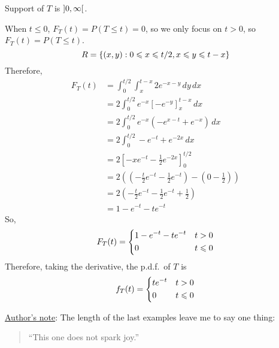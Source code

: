 \begin{Example}{}{}
\begin{enumerate}[label=(\roman*)]
              Support of $ T $ is $ \interval[open]{0}{\infty} $.

              When $ t\leqslant 0 $, $ F_T(t)=P(T\leqslant t)=0 $,
              so we only focus on $ t>0 $, so $ F_T(t)=P(T\leqslant t) $.
              \[ R=\{(x,y):0\leqslant x\leqslant t/2, x\leqslant y\leqslant t-x\} \]
              Therefore,
              \begin{align*}
                  F_T(t)
                   & = \int_{0}^{t/2} \int_{x}^{t-x} 2e^{-x-y}\, d{y} \, d{x}             \\
                   & =2 \int_{0}^{t/2} e^{-x}\left[ -e^{-y} \right]_x^{t-x}\, d{x}        \\
                   & =2 \int_{0}^{t/2} e^{-x}\left( -e^{x-t}+e^{-x} \right)\, d{x}        \\
                   & =2 \int_{0}^{t/2} -e^{-t}+e^{-2x}\, d{x}                             \\
                   & =2\left[ -xe^{-t}-\frac{1}{2}e^{-2x} \right]_0^{t/2}                 \\
                   & =2\left( \left( -\frac{t}{2} e^{-t} -\frac{1}{2} e^{-t}\right)
                  -\left( 0-\frac{1}{2}  \right) \right)                                  \\
                   & =2\left( -\frac{t}{2} e^{-t}-\frac{1}{2} e^{-t}+\frac{1}{2}  \right) \\
                   & =1-e^{-t}-te^{-t}
              \end{align*}
              So,
              \[ F_T(t)=
                  \begin{dcases}
                      1-e^{-t}-te^{-t} & t>0          \\
                      0                & t\leqslant 0
                  \end{dcases} \]
              Therefore, taking the derivative, the p.d.f.\ of $ T $ is
              \[ f_T(t)=
                  \begin{dcases}
                      te^{-t} & t> 0         \\
                      0       & t\leqslant 0
                  \end{dcases} \]
    \end{enumerate}
\end{Example}
\underline{Author's note}: The length of the last examples leave me to say one thing:
\begin{quote}
    ``This one does not spark joy.''
\end{quote}
